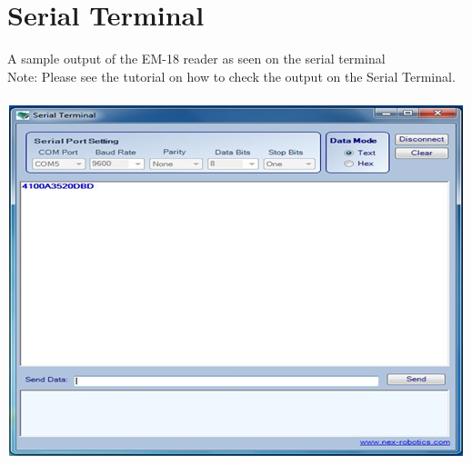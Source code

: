 \documentclass[a4paper,29.6pt]{article}
\begin{document}
\section{ Serial Terminal }
A sample output of the EM-18 reader as seen on the serial terminal\\
Note: Please see the tutorial on how to check the output on the Serial Terminal.\\\\
\includegraphics{serial}


\newpage
\end{document}

